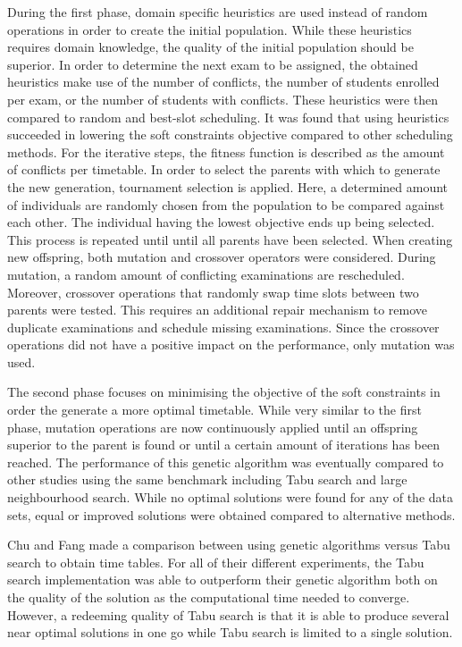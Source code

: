 During the first phase, domain specific heuristics are used instead of random operations in order to create the initial population. While these heuristics requires domain knowledge, the quality of the initial population should be superior. In order to determine the next exam to be assigned, the obtained heuristics make use of the number of conflicts, the number of students enrolled per exam, or the number of students with conflicts. These heuristics were then compared to random and best-slot scheduling. It was found that using heuristics succeeded in lowering the soft constraints objective compared to other scheduling methods. For the iterative steps, the fitness function is described as the amount of conflicts per timetable. In order to select the parents with which to generate the new generation, tournament selection is applied. Here, a determined amount of individuals are randomly chosen from the population to be compared against each other. The individual having the lowest objective ends up being selected. This process is repeated until until all parents have been selected. When creating new offspring, both mutation and crossover operators were considered. During mutation, a random amount of conflicting examinations are rescheduled. Moreover, crossover operations that randomly swap time slots between two parents were tested. This requires an additional repair mechanism to remove duplicate examinations and schedule missing examinations. Since the crossover operations did not have a positive impact on the performance, only mutation was used.

The second phase focuses on minimising the objective of the soft constraints in order the generate a more optimal timetable. While very similar to the first phase,  mutation operations are now continuously applied until an offspring superior to the parent is found or until a certain amount of iterations has been reached. The performance of this genetic algorithm was eventually compared to other studies using the same benchmark including Tabu search and large neighbourhood search. While no optimal solutions were found for any of the data sets, equal or improved solutions were obtained compared to alternative methods.

Chu and Fang \cite{Chu2000} made a comparison between using genetic algorithms versus Tabu search to obtain time tables. For all of their different experiments, the Tabu search implementation was able to outperform their genetic algorithm both on the quality of the solution as the computational time needed to converge. However, a redeeming quality of Tabu search is that it is able to produce several near optimal solutions in one go while Tabu search is limited to a single solution.
